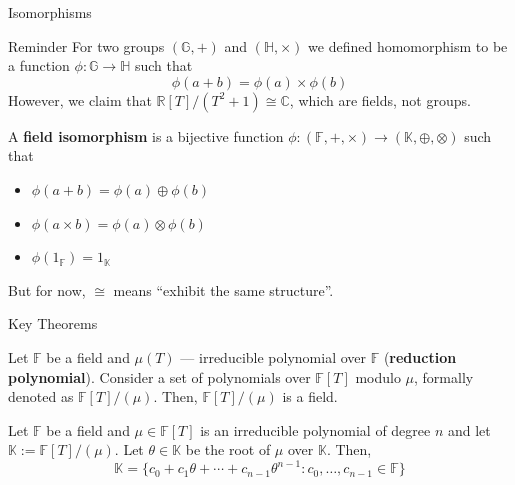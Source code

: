 \documentclass{zkdl-presentation-template}
\begin{document}
    \begin{frame}{Isomorphisms}
        \begin{remarkblock}{Reminder}
            For two groups $(\mathbb{G},+)$ and $(\mathbb{H},\times)$ we defined homomorphism to be a function $\phi: \mathbb{G} \to \mathbb{H}$ such that
            \begin{equation*}
                \phi(a+b) = \phi(a) \times \phi(b)
            \end{equation*}
            \pause However, we claim that $\mathbb{R}[T]/(T^2+1) \cong \mathbb{C}$, which are fields, not groups.\pause
        \end{remarkblock}

        \begin{definition}
            A \textbf{field isomorphism} is a bijective function $\phi: (\mathbb{F},+,\times) \to (\mathbb{K},\oplus,\otimes)$ such that
            \begin{itemize}
                \item $\phi(a+b) = \phi(a) \oplus \phi(b)$
                \item $\phi(a \times b) = \phi(a) \otimes \phi(b)$
                \item $\phi(1_{\mathbb{F}}) = 1_{\mathbb{K}}$
            \end{itemize}

            \pause But for now, $\cong$ means ``exhibit the same structure''.
        \end{definition}
    \end{frame}

    \begin{frame}{Key Theorems}
        \begin{theorem}
            Let $\mathbb{F}$ be a field and $\mu(T)$ --- irreducible polynomial over $\mathbb{F}$ (\textbf{reduction polynomial}). Consider a set of polynomials over $\mathbb{F}[T]$ modulo $\mu$, formally denoted as $\mathbb{F}[T]/(\mu)$. Then, $\mathbb{F}[T]/(\mu)$ is a field.\pause
        \end{theorem}

        \begin{theorem}
            Let $\mathbb{F}$ be a field and $\mu \in \mathbb{F}[T]$ is an irreducible polynomial of degree $n$ and let $\mathbb{K} := \mathbb{F}[T]/(\mu)$. Let $\theta \in \mathbb{K}$ be the root of $\mu$ over $\mathbb{K}$. Then,
            \begin{equation*}
                \mathbb{K} = \{c_0+c_1\theta+\cdots+c_{n-1}\theta^{n-1}: c_0,\dots,c_{n-1} \in \mathbb{F}\}
            \end{equation*}
        \end{theorem}
    \end{frame}
\end{document}
